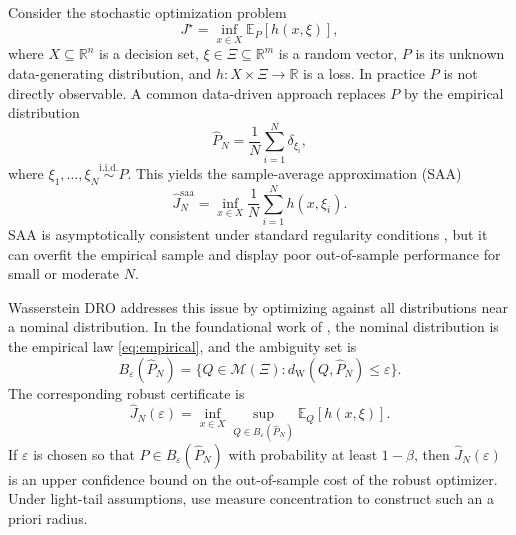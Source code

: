 \documentclass[11pt]{article}
\newcommand{\R}{\mathbb{R}}
\newcommand{\E}{\mathbb{E}}
\newcommand{\cM}{\mathcal{M}}
\newcommand{\XiSet}{\Xi}
\newcommand{\1}{\mathbf{1}}
\newcommand{\dW}{d_{\mathrm W}}
\newcommand{\Phat}{\widehat P_N}
\begin{document}
Consider the stochastic optimization problem
\begin{equation}\label{eq:true-sp}
    J^\star = \inf_{x\in X} \E_P[h(x,\xi)],
\end{equation}
where $X\subseteq\R^n$ is a decision set, $\xi\in\XiSet\subseteq\R^m$ is a random vector, $P$ is its unknown data-generating distribution, and $h:X\times\XiSet\to\R$ is a loss. In practice $P$ is not directly observable. A common data-driven approach replaces $P$ by the empirical distribution
\begin{equation}\label{eq:empirical}
    \Phat = \frac1N\sum_{i=1}^N \delta_{\xi_i},
\end{equation}
where $\xi_1,\ldots,\xi_N\overset{\mathrm{i.i.d.}}{\sim}P$. This yields the sample-average approximation (SAA)
\begin{equation}\label{eq:saa}
    \widehat J_N^{\mathrm{saa}} = \inf_{x\in X} \frac1N\sum_{i=1}^N h(x,\xi_i).
\end{equation}
SAA is asymptotically consistent under standard regularity conditions \citep{shapiro2009lectures}, but it can overfit the empirical sample and display poor out-of-sample performance for small or moderate $N$.

Wasserstein DRO addresses this issue by optimizing against all distributions near a nominal distribution. In the foundational work of \citet{esfahani2018data}, the nominal distribution is the empirical law \eqref{eq:empirical}, and the ambiguity set is
\begin{equation}\label{eq:empirical-ball}
    B_{\varepsilon}(\Phat)=\{Q\in\cM(\XiSet):\dW(Q,\Phat)\le \varepsilon\}.
\end{equation}
The corresponding robust certificate is
\begin{equation}\label{eq:empirical-dro}
    \widehat J_N(\varepsilon)=\inf_{x\in X}\sup_{Q\in B_{\varepsilon}(\Phat)} \E_Q[h(x,\xi)].
\end{equation}
If $\varepsilon$ is chosen so that $P\in B_\varepsilon(\Phat)$ with probability at least $1-\beta$, then $\widehat J_N(\varepsilon)$ is an upper confidence bound on the out-of-sample cost of the robust optimizer. Under light-tail assumptions, \citet{esfahani2018data} use measure concentration to construct such an a priori radius.
\end{document}
